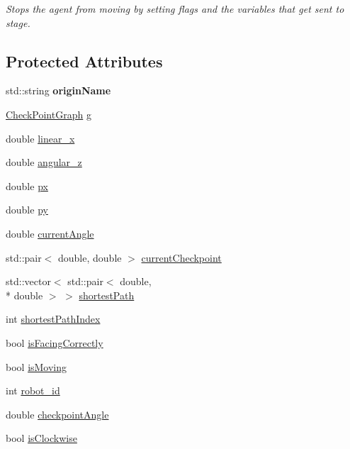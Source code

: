 \begin{DoxyCompactItemize}
\begin{DoxyCompactList}\small\item\em Stops the agent from moving by setting flags and the variables that get sent to stage. \end{DoxyCompactList}\end{DoxyCompactItemize}
\subsection*{Protected Attributes}
\begin{DoxyCompactItemize}
\item 
\hypertarget{classAgent_ae9ddc8a7bffee9c921d6628e6669df9c}{std\-::string {\bfseries origin\-Name}}\label{classAgent_ae9ddc8a7bffee9c921d6628e6669df9c}

\item 
\hyperlink{classCheckPointGraph}{Check\-Point\-Graph} \hyperlink{classAgent_a9c296226b7db0471d7a721dabe849c46}{g}
\item 
double \hyperlink{classAgent_a77dfc60513d8c90b2848297e09fffba7}{linear\-\_\-x}
\item 
double \hyperlink{classAgent_affc842049c5010a5f8bd99a62d650a25}{angular\-\_\-z}
\item 
double \hyperlink{classAgent_af51536ae3b511b53726b84b9226cc772}{px}
\item 
double \hyperlink{classAgent_a048e8b32d02a2fd58f046a444a287015}{py}
\item 
double \hyperlink{classAgent_a389e3229e62da28d6c686354329e25aa}{current\-Angle}
\item 
std\-::pair$<$ double, double $>$ \hyperlink{classAgent_a0ca673bd13a3e9aa8235db73eb4b5391}{current\-Checkpoint}
\item 
std\-::vector$<$ std\-::pair$<$ double, \\*
double $>$ $>$ \hyperlink{classAgent_ac7175c1ed11e2b571d434bd25f4c096f}{shortest\-Path}
\item 
int \hyperlink{classAgent_aa1f106d069420fb5995338cfa4f8799b}{shortest\-Path\-Index}
\item 
bool \hyperlink{classAgent_afeaa67851b662b45d4d6fcd5eaf5acc3}{is\-Facing\-Correctly}
\item 
bool \hyperlink{classAgent_aab5675be1775cd18ff37e3e1870d51be}{is\-Moving}
\item 
int \hyperlink{classAgent_aefcf2085a669d7e91d932e7cc3ee88ce}{robot\-\_\-id}
\item 
double \hyperlink{classAgent_a894e975009220db4a8faa7c23fc0b4d6}{checkpoint\-Angle}
\item 
bool \hyperlink{classAgent_ae4169e63cd18fa7785d4561746f676d1}{is\-Clockwise}
\end{DoxyCompactItemize}


